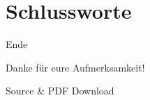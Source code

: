 \documentclass[
	aspectratio=169, 
	10pt 
]{beamer}
\begin{document}
\section{Schlussworte}
\begin{frame}{Ende}
    \begin{fancycolumns}[widths={30}]
        \nextcolumn
        \begin{center}
            \LARGE{Danke für eure Aufmerksamkeit!}
        \end{center}
    \end{fancycolumns}
    
    \begin{fancycolumns}[widths={30}]
        \begin{center}
            Source \& PDF Download
        \end{center}
    \end{fancycolumns}
\end{frame}
\end{document}
